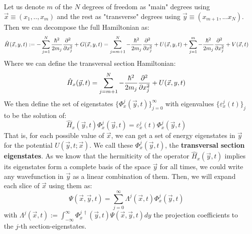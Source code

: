 \documentclass[11pt, a4paper]{article} %
\begin{document}
Let us denote $m$ of the $N$ degrees of freedom as "main" degrees using $\vec{x}\equiv(x_1,..,x_m)$ and the rest as "transverse" degrees using $\vec{y}\equiv(x_{m+1},...x_N)$. Then we can decompose the full Hamiltonian as:
\begin{equation}
\hat{H}(\vec{x}, y, t):= -\sum_{j=1}^N\frac{\hbar^2}{2m_j}\pdv[2]{}{x_j}+G(\vec{x}, y, t)=\sum_{j=m+1}^{N}-\frac{\hbar^2}{2m_j}\pdv[2]{}{x_j}+U(\vec{x}, y, t)+\sum_{j=1}^{m}-\frac{\hbar^2}{2m_j}\pdv[2]{}{x_j}+V(\vec{x},t)
\end{equation}
Where we can define the transversal section Hamiltonian:\vspace{-0.05cm}
\begin{equation}
\hat{H}_x(\vec{y},t)=\sum_{j=m+1}^{N}-\frac{\hbar^2}{2m_j}\pdv[2]{}{x_j}+U(\vec{x}, y, t)\vspace{-0.1cm}
\end{equation} \vspace{-0.2cm}
We then define the set of eigenstates $\{\Phi^j_x(\vec{y},t)\}_{j=0}^\infty$ with eigenvalues $\{\varepsilon_x^j(t)\}_j$ to be the solution of:\vspace{0.2cm}
\begin{equation}\label{transvE}
\hat{H}_x(\vec{y},t)\Phi^j_x(\vec{y},t)=\varepsilon^j_x(t)\Phi^j_x(\vec{y},t)
\end{equation}
That is, for each possible value of $\vec{x}$, we can get a set of energy eigenstates in $\vec{y}$ for the potential $U(\vec{y},t;\vec{x})$. We call these $\Phi^j_x(\vec{y},t)$, the {\bf transversal section eigenstates}. As we know that the hermiticity of the operator $\hat{H}_x(\vec{y},t)$ implies its eigenstates form a complete basis of the space $\vec{y}$ for all times, we could write any wavefunction in $\vec{y}$ as a linear combination of them. Then, we will expand each slice of $\vec{x}$ using them as:\vspace{-0.2cm}
\begin{equation}\label{BHExp}
\Psi(\vec{x},\vec{y},t)=\sum_{j=0}^\infty \Lambda^j(\vec{x},t) \Phi^j_x(\vec{y},t)
\end{equation}\vspace{-0.2cm}
with $\Lambda^j(\vec{x},t):= \int_{-\infty}^{\infty}\Phi^{j\ \dagger}_x(\vec{y},t) \Psi(\vec{x},\vec{y},t)dy$ the projection coefficients to the $j$-th section-eigenstates.
\end{document}
